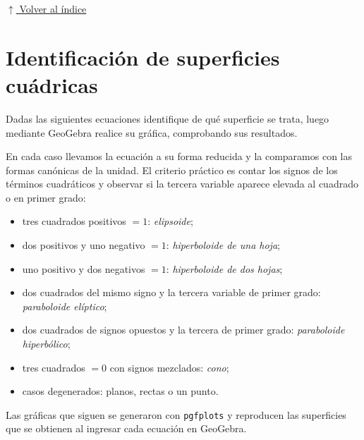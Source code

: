 \documentclass[12pt]{article}
\newcommand{\volverindice}{%
    \vspace{1em}%
    \begin{flushright}%
        \hyperlink{indice}{\small $\uparrow$ Volver al índice}%
    \end{flushright}%
}
\begin{document}
\volverindice
\newpage


\section{Identificación de superficies cuádricas}

Dadas las siguientes ecuaciones identifique de qué superficie se trata, luego
mediante GeoGebra realice su gráfica, comprobando sus resultados.

\vspace{0.5em}
En cada caso llevamos la ecuación a su forma reducida y la comparamos con las
formas canónicas de la unidad. El criterio práctico es contar los signos de los
términos cuadráticos y observar si la tercera variable aparece elevada al
cuadrado o en primer grado:

\begin{itemize}[leftmargin=2em, itemsep=0.1em]
    \item tres cuadrados positivos $=1$: \emph{elipsoide};
    \item dos positivos y uno negativo $=1$: \emph{hiperboloide de una hoja};
    \item uno positivo y dos negativos $=1$: \emph{hiperboloide de dos hojas};
    \item dos cuadrados del mismo signo y la tercera variable de primer grado:
    \emph{paraboloide elíptico};
    \item dos cuadrados de signos opuestos y la tercera de primer grado:
    \emph{paraboloide hiperbólico};
    \item tres cuadrados $=0$ con signos mezclados: \emph{cono};
    \item casos degenerados: planos, rectas o un punto.
\end{itemize}

Las gráficas que siguen se generaron con \texttt{pgfplots} y reproducen las
superficies que se obtienen al ingresar cada ecuación en GeoGebra.
\end{document}
